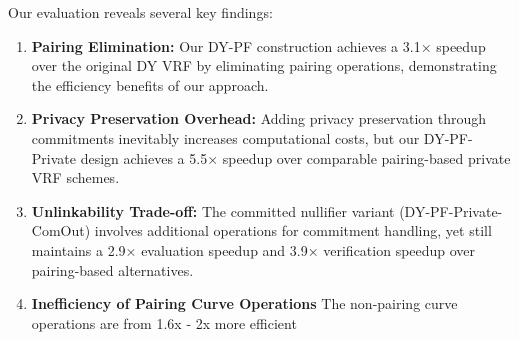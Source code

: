 Our evaluation reveals several key findings:

\begin{enumerate}
    \item \textbf{Pairing Elimination:} Our DY-PF construction achieves a 3.1× speedup over the original DY VRF by eliminating pairing operations, demonstrating the efficiency benefits of our approach.
    
    \item \textbf{Privacy Preservation Overhead:} Adding privacy preservation through commitments inevitably increases computational costs, but our DY-PF-Private design achieves a 5.5× speedup over comparable pairing-based private VRF schemes.
    
    \item \textbf{Unlinkability Trade-off:} The committed nullifier variant (DY-PF-Private-ComOut) involves additional operations for commitment handling, yet still maintains a 2.9× evaluation speedup and 3.9× verification speedup over pairing-based alternatives.

    \item \textbf{Inefficiency of Pairing Curve Operations} The non-pairing curve operations are from 1.6x - 2x more efficient
\end{enumerate}










    
    




